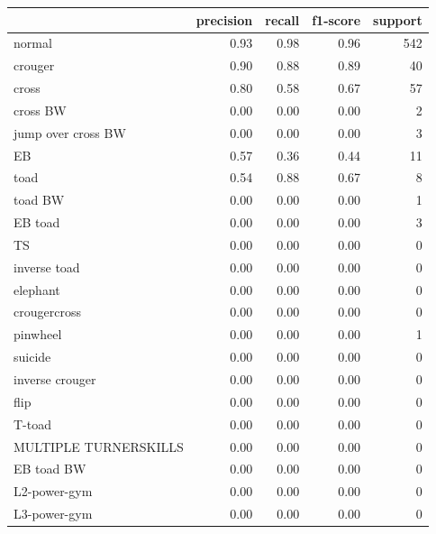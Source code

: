 \begin{table}[h!]
    \begin{tabular}{|l|r|r|r|r|}
                \hline & precision &   recall & f1-score &  support \\ \hline
               normal &      0.93 &     0.98 &     0.96 &      542 \\
              crouger &      0.90 &     0.88 &     0.89 &       40 \\
                cross &      0.80 &     0.58 &     0.67 &       57 \\
             cross BW &      0.00 &     0.00 &     0.00 &        2 \\
   jump over cross BW &      0.00 &     0.00 &     0.00 &        3 \\
                   EB &      0.57 &     0.36 &     0.44 &       11 \\
                 toad &      0.54 &     0.88 &     0.67 &        8 \\
              toad BW &      0.00 &     0.00 &     0.00 &        1 \\
              EB toad &      0.00 &     0.00 &     0.00 &        3 \\
                   TS &      0.00 &     0.00 &     0.00 &        0 \\
         inverse toad &      0.00 &     0.00 &     0.00 &        0 \\
             elephant &      0.00 &     0.00 &     0.00 &        0 \\
         crougercross &      0.00 &     0.00 &     0.00 &        0 \\
             pinwheel &      0.00 &     0.00 &     0.00 &        1 \\
              suicide &      0.00 &     0.00 &     0.00 &        0 \\
      inverse crouger &      0.00 &     0.00 &     0.00 &        0 \\
                 flip &      0.00 &     0.00 &     0.00 &        0 \\
               T-toad &      0.00 &     0.00 &     0.00 &        0 \\
MULTIPLE TURNERSKILLS &      0.00 &     0.00 &     0.00 &        0 \\
           EB toad BW &      0.00 &     0.00 &     0.00 &        0 \\
         L2-power-gym &      0.00 &     0.00 &     0.00 &        0 \\
         L3-power-gym &      0.00 &     0.00 &     0.00 &        0 \\

\end{tabular}
\end{table}
